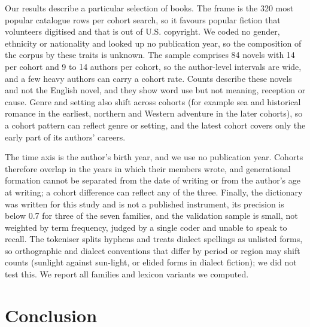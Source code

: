 \documentclass[11pt]{article}
\begin{document}
Our results describe a particular selection of books. The frame is the 320 most popular catalogue rows per cohort search, so it favours popular fiction that volunteers digitised and that is out of U.S. copyright. We coded no gender, ethnicity or nationality and looked up no publication year, so the composition of the corpus by these traits is unknown. The sample comprises 84 novels with 14 per cohort and 9 to 14 authors per cohort, so the author-level intervals are wide, and a few heavy authors can carry a cohort rate. Counts describe these novels and not the English novel, and they show word use but not meaning, reception or cause. Genre and setting also shift across cohorts (for example sea and historical romance in the earliest, northern and Western adventure in the later cohorts), so a cohort pattern can reflect genre or setting, and the latest cohort covers only the early part of its authors' careers.

The time axis is the author's birth year, and we use no publication year. Cohorts therefore overlap in the years in which their members wrote, and generational formation cannot be separated from the date of writing or from the author's age at writing; a cohort difference can reflect any of the three. Finally, the dictionary was written for this study and is not a published instrument, its precision is below 0.7 for three of the seven families, and the validation sample is small, not weighted by term frequency, judged by a single coder and unable to speak to recall. The tokeniser splits hyphens and treats dialect spellings as unlisted forms, so orthographic and dialect conventions that differ by period or region may shift counts (sunlight against sun-light, or elided forms in dialect fiction); we did not test this. We report all families and lexicon variants we computed.

\section{Conclusion}
\end{document}
